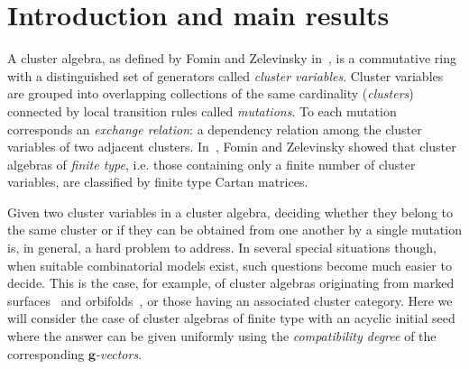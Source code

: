 \documentclass[pdftex]{sigma}
\numberwithin{equation}{section}
\numberwithin{figure}{section}
\newcommand{\bg}{\mathbf{g}}
\begin{document}
\renewcommand{\PaperNumber}{***}

\FirstPageHeading











\section{Introduction and main results}
  A cluster algebra, as defined by Fomin and Zelevinsky in~\cite{FZ02}, is a commutative ring with a distinguished set of generators called \emph{cluster variables}.
  Cluster variables are grouped into overlapping collections of the same cardinality (\emph{clusters}) connected by local transition rules called \emph{mutations}.
  To each mutation corresponds an \emph{exchange relation}: a dependency relation among the cluster variables of two adjacent clusters.
  In~\cite{FZ03}, Fomin and Zelevinsky showed that cluster algebras of \emph{finite type}, i.e. those containing only a finite number of cluster variables, are classified by finite type Cartan matrices.

  Given two cluster variables in a cluster algebra, deciding whether they belong to the same cluster or if they can be obtained from one another by a single mutation is, in general, a hard problem to address.
  In several special situations though, when suitable combinatorial models exist, such questions become much easier to decide.
  This is the case, for example, of cluster algebras originating from marked surfaces~\cite{FST08,FT12} and orbifolds~\cite{FST12}, or those having an associated cluster category.
  Here we will consider the case of cluster algebras of finite type with an acyclic initial seed where the answer can be given uniformly using the \emph{compatibility degree} of the corresponding \emph{$\bg$-vectors}.
\end{document}
